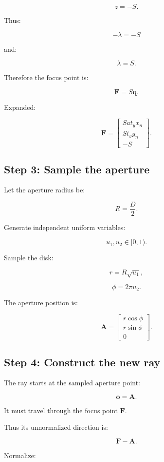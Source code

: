 \[ z=-S. \]

Thus:

\[ -\lambda=-S \]

and:

\[ \lambda=S. \]

Therefore the focus point is:

\[ \boxed{ \mathbf F=S\mathbf q. } \]

Expanded:

\[ \boxed{ \mathbf F= \begin{bmatrix} Sa t_yx_n\\ St_yy_n\\ -S \end{bmatrix}. } \]

\subsection{Step 3: Sample the aperture}\label{02-foundations-ii-ch036-step-3-sample-the-aperture}

Let the aperture radius be:

\[ R=\frac D2. \]

Generate independent uniform variables:

\[ u_1,u_2\in[0,1). \]

Sample the disk:

\[ r=R\sqrt{u_1}, \]

\[ \phi=2\pi u_2. \]

The aperture position is:

\[ \boxed{ \mathbf A= \begin{bmatrix} r\cos\phi\\ r\sin\phi\\ 0 \end{bmatrix}. } \]

\subsection{Step 4: Construct the new ray}\label{02-foundations-ii-ch036-step-4-construct-the-new-ray}

The ray starts at the sampled aperture point:

\[ \boxed{ \mathbf o=\mathbf A. } \]

It must travel through the focus point \(\mathbf F\).

Thus its unnormalized direction is:

\[ \mathbf F-\mathbf A. \]

Normalize:

